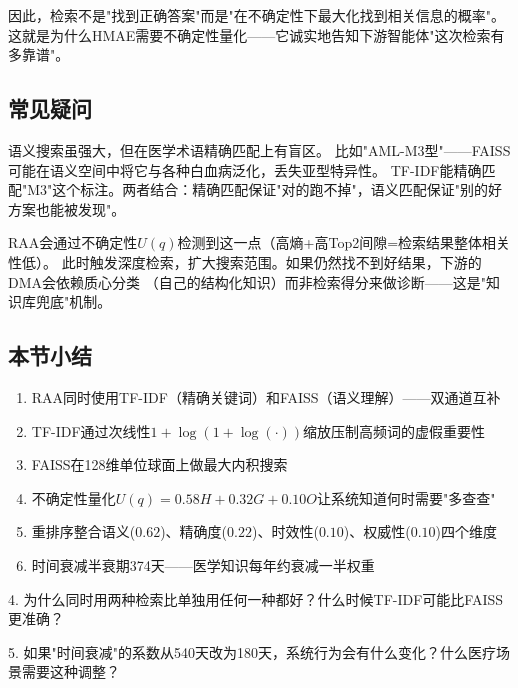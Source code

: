 \documentclass[11pt,a4paper]{ctexart}
\begin{document}
因此，检索不是"找到正确答案"而是"在不确定性下最大化找到相关信息的概率"。
这就是为什么HMAE需要不确定性量化——它诚实地告知下游智能体"这次检索有多靠谱"。

\subsection{常见疑问}

\begin{warnbox}
语义搜索虽强大，但在医学术语精确匹配上有盲区。
比如"AML-M3型"——FAISS可能在语义空间中将它与各种白血病泛化，丢失亚型特异性。
TF-IDF能精确匹配"M3"这个标注。两者结合：精确匹配保证"对的跑不掉"，语义匹配保证"别的好方案也能被发现"。
\end{warnbox}

\begin{warnbox}[如果知识库中没有相关文档怎么办？]
RAA会通过不确定性$U(q)$检测到这一点（高熵+高Top2间隙=检索结果整体相关性低）。
此时触发深度检索，扩大搜索范围。如果仍然找不到好结果，下游的DMA会依赖质心分类
（自己的结构化知识）而非检索得分来做诊断——这是"知识库兜底"机制。
\end{warnbox}

\subsection{本节小结}

\begin{enumerate}[nosep]
\item RAA同时使用TF-IDF（精确关键词）和FAISS（语义理解）——双通道互补
\item TF-IDF通过次线性$1+\log(1+\log(\cdot))$缩放压制高频词的虚假重要性
\item FAISS在128维单位球面上做最大内积搜索
\item 不确定性量化$U(q) = 0.58H + 0.32G + 0.10O$让系统知道何时需要"多查查"
\item 重排序整合语义($0.62$)、精确度($0.22$)、时效性($0.10$)、权威性($0.10$)四个维度
\item 时间衰减半衰期374天——医学知识每年约衰减一半权重
\end{enumerate}

\begin{exerbox}[思考题 4--5]
4. 为什么同时用两种检索比单独用任何一种都好？什么时候TF-IDF可能比FAISS更准确？

5. 如果"时间衰减"的系数从540天改为180天，系统行为会有什么变化？什么医疗场景需要这种调整？
\end{exerbox}
\end{document}
